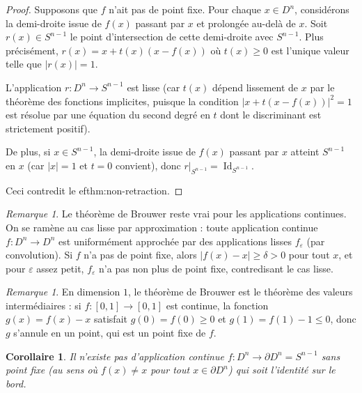 \documentclass[12pt,a4paper,openany]{book}
\theoremstyle{definition}
\theoremstyle{plain}
\newtheorem{corollaire}[definition]{Corollaire}
\theoremstyle{remark}
\newtheorem{remarque}[definition]{Remarque}
\DeclareMathOperator{\Id}{Id}
\newcommand{\abs}[1]{\left|#1\right|}
\begin{document}
\begin{proof}
Supposons que $f$ n'ait pas de point fixe. Pour chaque $x \in D^n$,
considérons la demi-droite issue de $f(x)$ passant par $x$ et prolongée
au-delà de $x$. Soit $r(x) \in S^{n-1}$ le point d'intersection de cette
demi-droite avec $S^{n-1}$. Plus précisément, $r(x) = x + t(x)(x - f(x))$
où $t(x) \geq 0$ est l'unique valeur telle que $\abs{r(x)} = 1$.

L'application $r \colon D^n \to S^{n-1}$ est lisse (car $t(x)$ dépend
lissement de $x$ par le théorème des fonctions implicites, puisque la
condition $\abs{x + t(x-f(x))}^2 = 1$ est résolue par une équation du
second degré en $t$ dont le discriminant est strictement positif).

De plus, si $x \in S^{n-1}$, la demi-droite issue de $f(x)$ passant par $x$
atteint $S^{n-1}$ en $x$ (car $\abs{x} = 1$ et $t = 0$ convient), donc
$r|_{S^{n-1}} = \Id_{S^{n-1}}$.

Ceci contredit le 
ef{thm:non-retraction}.
\end{proof}

\begin{remarque}\label{rem:brouwer-continu}
Le théorème de Brouwer reste vrai pour les applications continues. On se
ramène au cas lisse par approximation : toute application continue
$f \colon D^n \to D^n$ est uniformément approchée par des applications lisses
$f_\varepsilon$ (par convolution). Si $f$ n'a pas de point fixe, alors
$\abs{f(x) - x} \geq \delta > 0$ pour tout $x$, et pour $\varepsilon$
assez petit, $f_\varepsilon$ n'a pas non plus de point fixe, contredisant
le cas lisse.
\end{remarque}

\begin{remarque}\label{rem:brouwer-dimension-1}
En dimension $1$, le théorème de Brouwer est le théorème des valeurs
intermédiaires : si $f \colon [0,1] \to [0,1]$ est continue, la fonction
$g(x) = f(x) - x$ satisfait $g(0) = f(0) \geq 0$ et $g(1) = f(1) - 1 \leq 0$,
donc $g$ s'annule en un point, qui est un point fixe de $f$.
\end{remarque}

\begin{corollaire}\label{cor:borsuk-ulam-faible}
Il n'existe pas d'application continue $f \colon D^n \to \partial D^n = S^{n-1}$
sans point fixe (au sens où $f(x) \neq x$ pour tout $x \in \partial D^n$) qui
soit l'identité sur le bord.
\end{corollaire}
\end{document}
